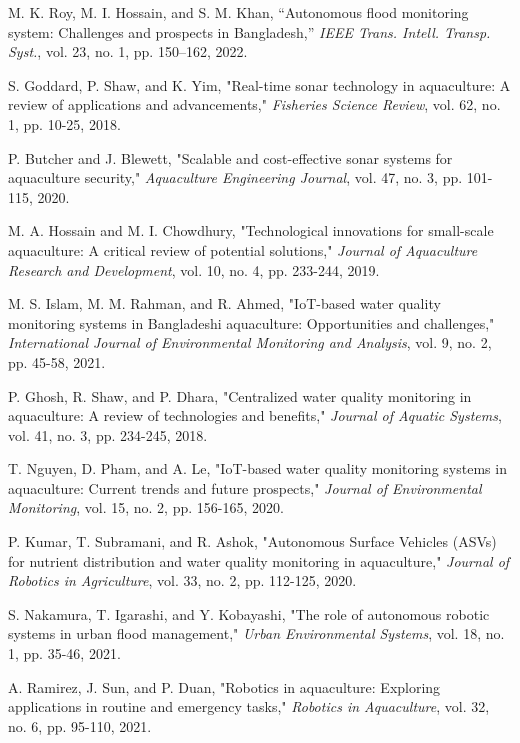 \documentclass[conference]{IEEEtran}
\begin{document}
\begin{thebibliography}{99}
 M. K. Roy, M. I. Hossain, and S. M. Khan, “Autonomous flood monitoring system: Challenges and prospects in Bangladesh,” \textit{IEEE Trans. Intell. Transp. Syst.}, vol. 23, no. 1, pp. 150–162, 2022.

 S. Goddard, P. Shaw, and K. Yim, "Real-time sonar technology in aquaculture: A review of applications and advancements," \textit{Fisheries Science Review}, vol. 62, no. 1, pp. 10-25, 2018.

 P. Butcher and J. Blewett, "Scalable and cost-effective sonar systems for aquaculture security," \textit{Aquaculture Engineering Journal}, vol. 47, no. 3, pp. 101-115, 2020.

 M. A. Hossain and M. I. Chowdhury, "Technological innovations for small-scale aquaculture: A critical review of potential solutions," \textit{Journal of Aquaculture Research and Development}, vol. 10, no. 4, pp. 233-244, 2019.

 M. S. Islam, M. M. Rahman, and R. Ahmed, "IoT-based water quality monitoring systems in Bangladeshi aquaculture: Opportunities and challenges," \textit{International Journal of Environmental Monitoring and Analysis}, vol. 9, no. 2, pp. 45-58, 2021.

 P. Ghosh, R. Shaw, and P. Dhara, "Centralized water quality monitoring in aquaculture: A review of technologies and benefits," \textit{Journal of Aquatic Systems}, vol. 41, no. 3, pp. 234-245, 2018.

 T. Nguyen, D. Pham, and A. Le, "IoT-based water quality monitoring systems in aquaculture: Current trends and future prospects," \textit{Journal of Environmental Monitoring}, vol. 15, no. 2, pp. 156-165, 2020.

 P. Kumar, T. Subramani, and R. Ashok, "Autonomous Surface Vehicles (ASVs) for nutrient distribution and water quality monitoring in aquaculture," \textit{Journal of Robotics in Agriculture}, vol. 33, no. 2, pp. 112-125, 2020.

 S. Nakamura, T. Igarashi, and Y. Kobayashi, "The role of autonomous robotic systems in urban flood management," \textit{Urban Environmental Systems}, vol. 18, no. 1, pp. 35-46, 2021.

 A. Ramirez, J. Sun, and P. Duan, "Robotics in aquaculture: Exploring applications in routine and emergency tasks," \textit{Robotics in Aquaculture}, vol. 32, no. 6, pp. 95-110, 2021.


\end{thebibliography}
\end{document}

